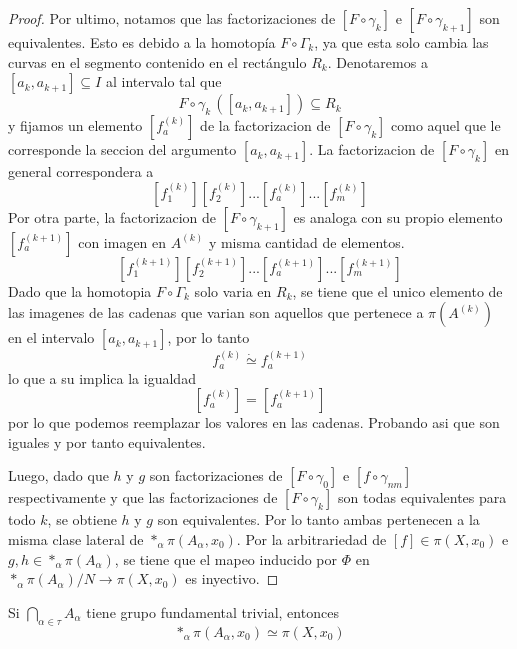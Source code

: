 \begin{proof}
  Por ultimo, notamos que las factorizaciones de \([F \circ \gamma_k]\) e
  \([F \circ \gamma_{k+1}]\) son equivalentes. Esto es debido a la
  homotopía \(F \circ \Gamma_k\), ya que esta solo cambia las curvas en el
  segmento contenido en el rectángulo \(R_k\). Denotaremos a \([a_k,
  a_{k+1}] \subseteq I\) al intervalo tal que
  \[F \circ \gamma_k \, ([a_k , a_{k+1}]) \subseteq R_k\]
  y fijamos un elemento \([f_a^{(k)}]\) de la factorizacion de \([F
  \circ \gamma_k]\) como aquel que le corresponde la seccion del argumento
  \([a_k , a_{k+1}]\). La factorizacion de \([F \circ \gamma_k]\) en
  general correspondera a
  \[ [f_1^{(k)}] [f_2^{(k)}] ... [f_a^{(k)}] ... [f_m^{(k)}] \]
  Por otra parte, la factorizacion de \([F \circ \gamma_{k+1}]\) es
  analoga con su propio elemento \([f_a^{(k+1)}]\) con imagen en
  \(A^{(k)}\) y misma cantidad de elementos.
  \[ [f_1^{(k+1)}] [f_2^{(k+1)}] ... [f_a^{(k+1)}] ... [f_m^{(k+1)}] \]
  Dado que la homotopia \(F \circ \Gamma_k\) solo varia en \(R_k\), se
  tiene que el unico elemento de las imagenes de las cadenas que varian
  son aquellos que pertenece a \(\pi (A^{(k)})\) en el intervalo \([a_k,
  a_{k+1}]\), por lo tanto
  \[ f_a^{(k)} \dot \simeq f_a^{(k+1)} \]
  lo que a su implica la igualdad
  \[ [f_a^{(k)}] = [f_a^{(k+1)}]\]
  por lo que podemos reemplazar los valores en las cadenas. Probando asi
  que son iguales y por tanto equivalentes.

  Luego, dado que \(h\) y \(g\) son factorizaciones de \([F \circ
  \gamma_0]\) e \([f \circ \gamma_{nm}]\) respectivamente y que las
  factorizaciones de \([F \circ \gamma_k]\) son todas equivalentes para
  todo \(k\), se obtiene \(h\) y \(g\) son equivalentes. Por lo tanto
  ambas pertenecen a la misma clase lateral de \(*_\alpha \pi (A_\alpha ,
  x_0)\). Por la arbitrariedad de \([f] \in \pi (X, x_0)\) e \(g,h \in
  *_\alpha \pi (A_\alpha)\), se tiene que el mapeo inducido por \(\Phi\)
  en \(*_\alpha \pi (A_\alpha) / N \to \pi (X,x_0)\) es inyectivo.
\end{proof}
\begin{corolario} \label{cor:vank-trivial}
  Si \(\bigcap_{\alpha \in \tau} A_\alpha \) tiene grupo fundamental
  trivial, entonces
  \[ *_\alpha \pi (A_\alpha , x_0) \simeq \pi (X, x_0) \]
\end{corolario}

